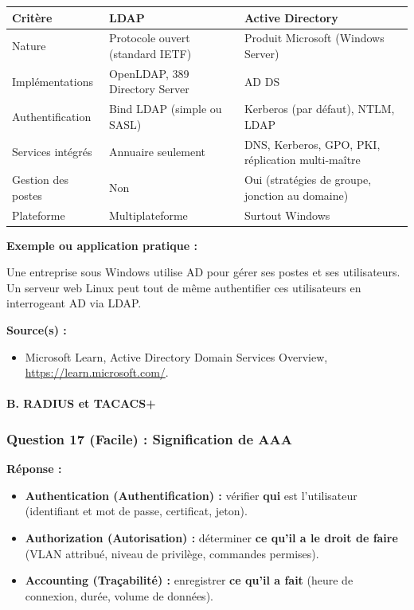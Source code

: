 \documentclass[12pt,a4paper]{article}
\newcommand{\reponse}{\textbf{Réponse :}\par}
\newcommand{\exemple}{\textbf{Exemple ou application pratique :}\par}
\newcommand{\sources}{\textbf{Source(s) :}}
\begin{document}
\begin{longtable}{|L{3.4cm}|L{5.6cm}|L{5.6cm}|}
\hline
\textbf{Critère} & \textbf{LDAP} & \textbf{Active Directory} \\ \hline
\endhead
Nature & Protocole ouvert (standard IETF) & Produit Microsoft
(Windows Server) \\ \hline
Implémentations & OpenLDAP, 389 Directory Server & AD DS \\ \hline
Authentification & Bind LDAP (simple ou SASL) & Kerberos (par défaut),
NTLM, LDAP \\ \hline
Services intégrés & Annuaire seulement & DNS, Kerberos, GPO, PKI,
réplication multi-maître \\ \hline
Gestion des postes & Non & Oui (stratégies de groupe, jonction au
domaine) \\ \hline
Plateforme & Multiplateforme & Surtout Windows \\ \hline
\end{longtable}

\exemple
Une entreprise sous Windows utilise AD pour gérer ses postes et ses
utilisateurs. Un serveur web Linux peut tout de même authentifier ces
utilisateurs en interrogeant AD via LDAP.

\sources
\begin{itemize}
    \item Microsoft Learn, Active Directory Domain Services Overview,
    \url{https://learn.microsoft.com/}.
\end{itemize}

\paragraph{B. RADIUS et TACACS+}

\subsubsection*{Question 17 (Facile) : Signification de AAA}

\reponse
\begin{itemize}
    \item \textbf{Authentication (Authentification) :} vérifier
    \textbf{qui} est l'utilisateur (identifiant et mot de passe,
    certificat, jeton).
    \item \textbf{Authorization (Autorisation) :} déterminer \textbf{ce
    qu'il a le droit de faire} (VLAN attribué, niveau de privilège,
    commandes permises).
    \item \textbf{Accounting (Traçabilité) :} enregistrer \textbf{ce
    qu'il a fait} (heure de connexion, durée, volume de données).
\end{itemize}
\end{document}

